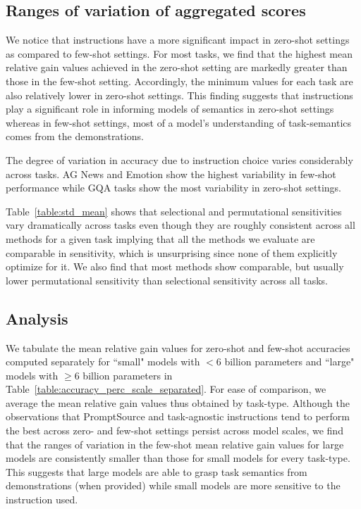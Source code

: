\subsection{Ranges of variation of aggregated scores}
We notice that instructions have a more significant impact in zero-shot settings as compared to few-shot settings. For most tasks, we find that the highest mean relative gain values achieved in the zero-shot setting are markedly greater than those in the few-shot setting. Accordingly, the minimum values for each task are also relatively lower in zero-shot settings. This finding suggests that instructions play a significant role in informing models of semantics in zero-shot settings whereas in few-shot settings, most of a model's understanding of task-semantics comes from the demonstrations.

The degree of variation in accuracy due to instruction choice varies considerably across tasks. AG News and Emotion show the highest variability in few-shot performance while GQA tasks show the most variability in zero-shot settings.


Table~\ref{table:std_mean} shows that selectional and permutational sensitivities vary dramatically across tasks even though they are  roughly consistent across all methods for a given task implying that all the methods we evaluate are comparable in sensitivity, which is unsurprising since none of them explicitly optimize for it. We also find that most methods show comparable, but usually lower permutational sensitivity than selectional sensitivity across all tasks.

\subsection{Analysis}

We tabulate the mean relative gain values for zero-shot and few-shot accuracies computed separately for ``small" models with $<6$ billion parameters and ``large"
 models with $\ge 6$ billion parameters in Table~\ref{table:accuracy_perc_scale_separated}. For ease of comparison, we average the mean relative gain values thus obtained by task-type. 
Although the observations that PromptSource and task-agnostic instructions tend to perform the best across zero- and few-shot settings persist across model scales, we find that the ranges of variation in the few-shot mean relative gain values for large models are consistently smaller than those for small models for every task-type. This suggests that large models are able to grasp task semantics from demonstrations (when provided) while small models are more sensitive to the instruction used. 

